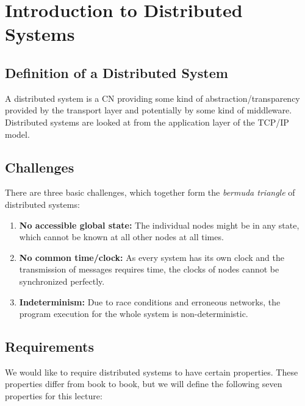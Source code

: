 \chapter{Introduction to Distributed Systems}

\section{Definition of a Distributed System}

A distributed system is a \ac{CN} providing some kind of abstraction/transparency provided by the transport layer and potentially by some kind of middleware. Distributed systems are looked at from the application layer of the TCP/IP model.

\section{Challenges}

There are three basic challenges, which together form the \textit{bermuda triangle} of distributed systems:

\begin{enumerate}
    \item \textbf{No accessible global state:} The individual nodes might be in any state, which cannot be known at all other nodes at all times.
    \item \textbf{No common time/clock:} As every system has its own clock and the transmission of messages requires time, the clocks of nodes cannot be synchronized perfectly.
    \item \textbf{Indeterminism:} Due to race conditions and erroneous networks, the program execution for the whole system is non-deterministic.
\end{enumerate}

\section{Requirements}

We would like to require distributed systems to have certain properties. These properties differ from book to book, but we will define the following seven properties for this lecture:

